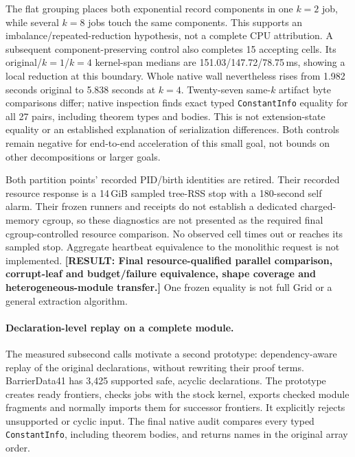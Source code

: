 \documentclass[10pt,twocolumn]{article}
\newcommand{\missing}[1]{\textbf{[RESULT: #1]}}
\begin{document}
The flat grouping places both exponential record components in one $k=2$
job, while several $k=8$ jobs touch the same components.
This supports an imbalance/repeated-reduction hypothesis, not a complete
CPU attribution. A subsequent component-preserving control also completes
15 accepting cells.
Its original/$k=1$/$k=4$ kernel-span medians are
151.03/147.72/78.75\,ms, showing a local reduction at this boundary.
Whole native wall nevertheless rises from 1.982 seconds original to
5.838 seconds at $k=4$.
Twenty-seven same-$k$ artifact byte comparisons differ; native inspection
finds exact typed \texttt{ConstantInfo} equality for all 27 pairs,
including theorem types and bodies. This is not extension-state equality
or an established explanation of serialization differences.
Both controls remain negative for end-to-end acceleration of this small goal,
not bounds on other decompositions or larger goals.

Both partition points' recorded PID/birth identities are retired.
Their recorded resource response is a 14\,GiB sampled tree-RSS stop with a
180-second self alarm. Their frozen runners and receipts do not establish a
dedicated charged-memory cgroup, so these diagnostics are not presented as
the required final cgroup-controlled resource comparison.
No observed cell times out or reaches its sampled stop.
Aggregate heartbeat equivalence to the monolithic request is not implemented.
\missing{Final resource-qualified parallel comparison, corrupt-leaf and
budget/failure equivalence, shape coverage and heterogeneous-module transfer.}
One frozen equality is not full Grid or a general extraction algorithm.

\paragraph{Declaration-level replay on a complete module.}
The measured subsecond calls motivate a second prototype: dependency-aware
replay of the original declarations, without rewriting their proof terms.
BarrierData41 has 3,425 supported safe, acyclic declarations.
The prototype creates ready frontiers, checks jobs with the stock kernel,
exports checked module fragments and normally imports them for successor
frontiers. It explicitly rejects unsupported or cyclic input.
The final native audit compares every typed \texttt{ConstantInfo}, including
theorem bodies, and returns names in the original array order.
\end{document}
